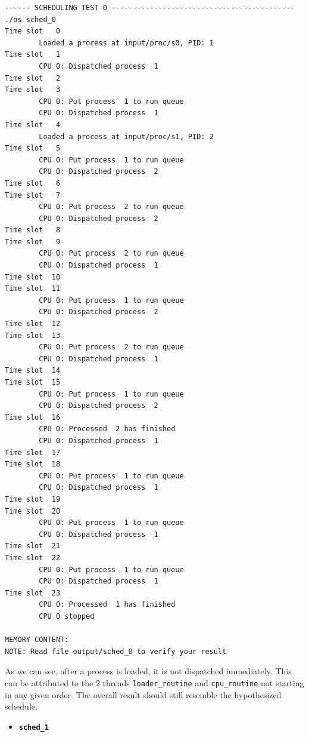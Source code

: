 \documentclass[a4paper]{article}
\numberwithin{equation}{section}
\begin{document}
\begin{mdframed}[leftline=false,rightline=false,backgroundcolor=teal!10,nobreak=false]
  \begin{verbatim}
------ SCHEDULING TEST 0 -------------------------------------------
./os sched_0
Time slot   0
        Loaded a process at input/proc/s0, PID: 1
Time slot   1
        CPU 0: Dispatched process  1
Time slot   2
Time slot   3
        CPU 0: Put process  1 to run queue
        CPU 0: Dispatched process  1
Time slot   4
        Loaded a process at input/proc/s1, PID: 2
Time slot   5
        CPU 0: Put process  1 to run queue
        CPU 0: Dispatched process  2
Time slot   6
Time slot   7
        CPU 0: Put process  2 to run queue
        CPU 0: Dispatched process  2
Time slot   8
Time slot   9
        CPU 0: Put process  2 to run queue
        CPU 0: Dispatched process  1
Time slot  10
Time slot  11
        CPU 0: Put process  1 to run queue
        CPU 0: Dispatched process  2
Time slot  12
Time slot  13
        CPU 0: Put process  2 to run queue
        CPU 0: Dispatched process  1
Time slot  14
Time slot  15
        CPU 0: Put process  1 to run queue
        CPU 0: Dispatched process  2
Time slot  16
        CPU 0: Processed  2 has finished
        CPU 0: Dispatched process  1
Time slot  17
Time slot  18
        CPU 0: Put process  1 to run queue
        CPU 0: Dispatched process  1
Time slot  19
Time slot  20
        CPU 0: Put process  1 to run queue
        CPU 0: Dispatched process  1
Time slot  21
Time slot  22
        CPU 0: Put process  1 to run queue
        CPU 0: Dispatched process  1
Time slot  23
        CPU 0: Processed  1 has finished
        CPU 0 stopped

MEMORY CONTENT:
NOTE: Read file output/sched_0 to verify your result
  \end{verbatim}
\end{mdframed}

As we can see, after a process is loaded, it is not dispatched immediately.
This can be attributed to the 2 threads \texttt{loader_routine} and \texttt{cpu_routine} not starting in any given order.
The overall result should still resemble the hypothesized schedule.

\begin{itemize}
  \item \textbf{\texttt{sched_1}}
\end{itemize}
\end{document}
